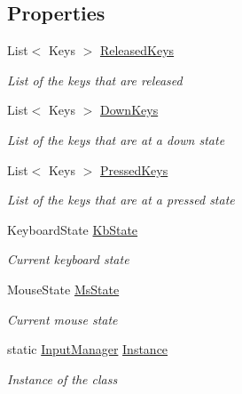 \subsection*{Properties}
\begin{DoxyCompactItemize}
\item 
List$<$ Keys $>$ \hyperlink{class_hel_project_1_1_tools_1_1_input_manager_a5add5e83ca9d72a3f1bc89e76572fd66}{Released\+Keys}
\begin{DoxyCompactList}\small\item\em List of the keys that are released \end{DoxyCompactList}\item 
List$<$ Keys $>$ \hyperlink{class_hel_project_1_1_tools_1_1_input_manager_a27207c596b9e4dc90bcb5415fac67ce1}{Down\+Keys}
\begin{DoxyCompactList}\small\item\em List of the keys that are at a down state \end{DoxyCompactList}\item 
List$<$ Keys $>$ \hyperlink{class_hel_project_1_1_tools_1_1_input_manager_a601df2e87297d6480c60e3fb825848b0}{Pressed\+Keys}
\begin{DoxyCompactList}\small\item\em List of the keys that are at a pressed state \end{DoxyCompactList}\item 
Keyboard\+State \hyperlink{class_hel_project_1_1_tools_1_1_input_manager_a69b805217e66f7c3b62e7df7b421635b}{Kb\+State}
\begin{DoxyCompactList}\small\item\em Current keyboard state \end{DoxyCompactList}\item 
Mouse\+State \hyperlink{class_hel_project_1_1_tools_1_1_input_manager_adb30a86d3417c694fa8b51e0a46b44cc}{Ms\+State}
\begin{DoxyCompactList}\small\item\em Current mouse state \end{DoxyCompactList}\item 
static \hyperlink{class_hel_project_1_1_tools_1_1_input_manager}{Input\+Manager} \hyperlink{class_hel_project_1_1_tools_1_1_input_manager_a6fe041106fd1ba820405f2ea5560a691}{Instance}
\begin{DoxyCompactList}\small\item\em Instance of the class \end{DoxyCompactList}\end{DoxyCompactItemize}


